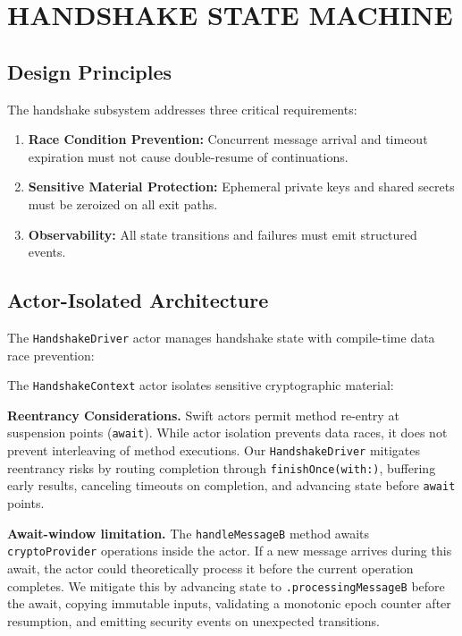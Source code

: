 \documentclass[10pt,journal,compsoc]{IEEEtran}
\providecommand{\tightlist}{%
  \setlength{\itemsep}{0pt}\setlength{\parskip}{0pt}}
\begin{document}
\section{HANDSHAKE STATE
MACHINE}\label{sec:handshake-state-machine}

\subsection{Design Principles}\label{a.-design-principles}

The handshake subsystem addresses three critical requirements:

\begin{enumerate}
\tightlist
\item
  \textbf{Race Condition Prevention:} Concurrent message arrival and
  timeout expiration must not cause double-resume of continuations.
\item
  \textbf{Sensitive Material Protection:} Ephemeral private keys and
  shared secrets must be zeroized on all exit paths.
\item
  \textbf{Observability:} All state transitions and failures must emit
  structured events.
\end{enumerate}

\subsection{Actor-Isolated
Architecture}\label{b.-actor-isolated-architecture}

The \texttt{HandshakeDriver} actor manages handshake state with
compile-time data race prevention:


The \texttt{HandshakeContext} actor isolates sensitive cryptographic
material:


\textbf{Reentrancy Considerations.} Swift actors permit method re-entry
at suspension points (\texttt{await}). While actor isolation prevents
data races, it does not prevent interleaving of method executions. Our
\texttt{HandshakeDriver} mitigates reentrancy risks by routing completion
through \texttt{finishOnce(with:)}, buffering early results, canceling
timeouts on completion, and advancing state before \texttt{await}
points.

\textbf{Await-window limitation.} The
\texttt{handle\allowbreak MessageB} method awaits \texttt{cryptoProvider} operations
inside the actor. If a new message arrives during this await, the actor
could theoretically process it before the current operation completes.
We mitigate this by advancing state to \texttt{.processingMessageB}
before the await, copying immutable inputs, validating a monotonic epoch
counter after resumption, and emitting security events on unexpected
transitions.
\end{document}
